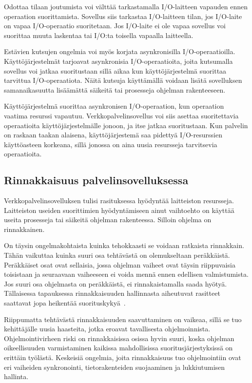 \documentclass[finnish]{tktltiki2}
\theoremstyle{definition}
\theoremstyle{remark}
\begin{document}
Odottaa tilaan joutumista voi välttää tarkastamalla
I/O-laitteen vapauden ennen operaation suorittamista.
Sovellus siis tarkastaa I/O-laitteen tilan, jos
I/O-laite on vapaa I/O-operaatio suoritetaan. Jos I/O-laite
ei ole vapaa sovellus voi suorittaa muuta laskentaa tai I/O:ta
toisella vapaalla laitteella.

Estävien kutsujen ongelmia voi myös korjata asynkronisilla I/O-operaatioilla.
Käyttöjärjestelmät tarjoavat asynkronisia I/O-operaatioita, joita kutsumalla
sovellus voi jatkaa suoritustaan sillä aikaa kun käyttöjärjestelmä
suorittaa tarvittua I/O-operaatiota. Näitä kutsuja käyttämällä voidaan
lisätä sovelluksen samanaikasuutta lisäämättä säikeitä
tai prosesseja ohjelman rakenteeseen.

Käyttöjärjestelmä suorittaa asynkronisen I/O-operaation,
kun operaation vaatima resurssi vapautuu. Verkkopalvelinsovellus
voi siis asettaa suoritettavia operaatioita käyttöjärjestelmälle
jonoon, ja itse jatkaa suoritustaan. Kun palvelin
on raskaan taakan alaisena, käyttöjärjestemä saa pidettyä
I/O-resurssien käyttöasteen korkeana, sillä jonossa on aina
uusia resursseja tarvitsevia operaatioita.

\subsection{Rinnakkaisuus palvelinsovelluksessa}
Verkkopalvelinsovelluksen tulisi rasituksessa hyödyntää 
laitteiston resursseja. Laitteiston useiden suorittimien
hyödyntämiseen ainut vaihtoehto on käyttää
useita prosesseja tai säikeitä ohjelman rakenteessa.
Silloin ohjelma on rinnakkainen.

On täysin ongelmakohtaista kuinka tehokkaasti se voidaan ratkaista rinnakkain.
Tähän vaikuttaa kuinka suuri osa tehtävästä on olemukseltaan peräkkäistä.
Peräkkäiset osat ovat sellaisia, jossa ohjelman vaiheet ovat täysin
riippuvaisia toisistaan ja seuraavaan vaiheeseen ei voida mennä ennen edellisen
valmistumista. Jos suuri osa ohjelmasta on peräkkäistä, ei rinnakaistamalla
saada hyötyä. Tällaisessa tapauksessa rinnakkaisuuden hallinnasta aiheutuvat
rasitteet saattavat jopa heikentää suorituskykyä~\cite{stallings_operating_2018}.

Riippumatta tehtävästä rinnakkaisuuden saavuttaminen on vaikeaa,
sillä se tuo kehittäjälle uusia haasteita, jotka eroavat tavallisesta
ohjelmoinnista. Ohjelmointivirheen riski on rinnakkaisissa osissa hyvin suuri,
koska ohjelman oikeellisuuden varmistaminen kaikissa mahdollisissa
suoritusjärjestyksissä on erittäin työlästä.
Keskeisiä ongelmia, joita rinnakkaisuus tuo ohjelmointiin ovat eri vaiheiden
synkronointi, tietorakenteiden suojaaminen ja lukkiutumisen hallinta.
\end{document}
